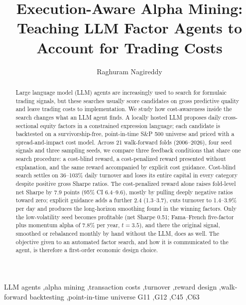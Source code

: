 \documentclass[preprint,12pt,authoryear]{elsarticle}
\begin{document}
\begin{frontmatter}

\title{Execution-Aware Alpha Mining: Teaching LLM Factor Agents to Account for Trading Costs}

\author{Raghuram Nagireddy}
\address{Independent Researcher; Columbia University (Alumni)}

\begin{abstract}
Large language model (LLM) agents are increasingly used to search for formulaic trading signals, but these searches usually score candidates on gross predictive quality and leave trading costs to implementation. We study how cost-awareness inside the search changes what an LLM agent finds. A locally hosted LLM proposes daily cross-sectional equity factors in a constrained expression language; each candidate is backtested on a survivorship-free, point-in-time S\&P 500 universe and priced with a spread-and-impact cost model. Across 21 walk-forward folds (2006--2026), four seed signals and three sampling seeds, we compare three feedback conditions that share one search procedure: a cost-blind reward, a cost-penalized reward presented without explanation, and the same reward accompanied by explicit cost guidance. Cost-blind search settles on 36--103\% daily turnover and loses its entire capital in every category despite positive gross Sharpe ratios. The cost-penalized reward alone raises fold-level net Sharpe by 7.9 points (95\% CI 6.4--9.6), mostly by pulling deeply negative ratios toward zero; explicit guidance adds a further 2.4 (1.3--3.7), cuts turnover to 1.4--3.9\% per day and produces the long-horizon smoothing found in the winning factors. Only the low-volatility seed becomes profitable (net Sharpe 0.51; Fama--French five-factor plus momentum alpha of 7.8\% per year, $t = 3.5$), and there the original signal, smoothed or rebalanced monthly by hand without the LLM, does as well. The objective given to an automated factor search, and how it is communicated to the agent, is therefore a first-order economic design choice.
\end{abstract}

\begin{keyword}
LLM agents \sep alpha mining \sep transaction costs \sep turnover \sep reward design \sep walk-forward backtesting \sep point-in-time universe
\JEL G11 \sep G12 \sep C45 \sep C63
\end{keyword}

\end{frontmatter}
\end{document}
